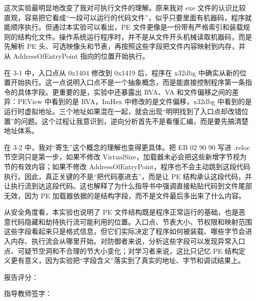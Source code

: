 ﻿\documentclass[12pt]{ctexart}
\begin{document}
\vspace{1.2cm}


这次实验最明显地改变了我对可执行文件的理解。原来我对 exe 文件的认识比较直观，容易把它看成“一段可以运行的代码文件”，似乎只要里面有机器码，程序就能顺序执行。但通过本实验可以看出，PE 文件更像是一份带有严格索引和装载规则的结构化文件。操作系统运行程序时，并不是从文件开头机械读取机器码，而是先解析 PE 头、可选映像头和节表，再按照这些字段把文件内容映射到内存，并从 AddressOfEntryPoint 指向的位置开始执行。

在 3-1 中，入口点从 0x1404 修改到 0x1419 后，程序在 x32dbg 中确实从新的位置开始执行。这一点说明入口点不是一个抽象概念，而是能直接控制程序第一条指令的具体字段。更重要的是，实验中还暴露出 RVA、VA 和文件偏移之间的差异：PEView 中看到的是 RVA，ImHex 中修改的是文件偏移，x32dbg 中看到的是运行时虚拟地址。三个地址如果混在一起，就会出现“明明找到了入口点却改错位置”的问题。这个过程让我意识到，逆向分析首先不是看懂汇编，而是要先搞清楚地址体系。

在 3-2 中，我对“寄生”这个概念的理解也变得更具体。把 EB 02 90 90 写进 .reloc 节空洞只是第一步，如果不修改 VirtualSize，加载器未必会把这些新增字节视为节的有效内容；如果不修改 AddressOfEntryPoint，程序也不会主动跳到这段代码执行。因此，真正关键的不是“把代码塞进去”，而是让 PE 结构承认这段代码，并让执行流到达这段代码。这也解释了为什么指导书中强调直接粘贴代码到文件尾部无效，因为 PE 加载器依据的是结构字段，而不是文件最后多出来了什么内容。

从安全角度看，本实验也说明了 PE 文件结构既是程序正常运行的基础，也是恶意代码隐藏和劫持执行流可能利用的位置。入口点、节表大小、节权限和映射范围这些字段看起来只是格式信息，但它们实际决定了程序如何被装载、哪些字节会进入内存、执行流会从哪里开始。对防御者来说，分析这些字段可以发现异常入口点、可疑节空洞和不合理的节大小变化；对学习者来说，这比只记忆 PE 结构定义更有意义，因为实验把“字段含义”落实到了真实的地址、字节和调试结果上。

\vspace{1.2cm}

\begin{flushright}
    {\heiti{} 报告评分：}\qquad\qquad\qquad\qquad

    \vspace{1.2cm}

    {\heiti{} 指导教师签字：}\qquad\qquad\qquad
\end{flushright}
\end{document}
